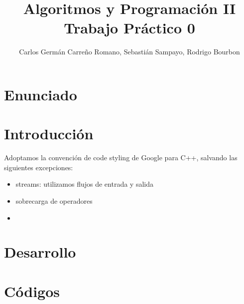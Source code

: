 \documentclass[10pt,a4paper]{article}
\title{Algoritmos y Programación II\\
Trabajo Práctico 0}
\author{Carlos Germán Carreño Romano, Sebastián Sampayo, Rodrigo Bourbon}
\begin{document}
\maketitle
\tableofcontents
\section{Enunciado}
\section{Introducción}
Adoptamos la convención de code styling de Google para C++, salvando las siguientes excepciones:\\
\begin{itemize}
\item streams: utilizamos flujos de entrada y salida
\item sobrecarga de operadores
\item 

\end{itemize}
\section{Desarrollo}
\section{Códigos}
\end{document}
